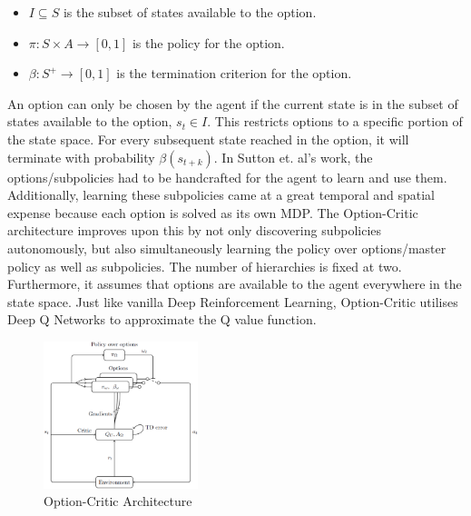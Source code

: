\documentclass[notitlepage,a4paper,11pt]{article}
\begin{document}
\begin{itemize}[noitemsep]
	\itemsep0em
	\item $I \subseteq S$ is the subset of states available to the option.
	\item $\pi : S \times A \to [0,1]$ is the policy for the option.
	\item $\beta : S^+ \to [0,1]$ is the termination criterion for the option.
\end{itemize}

An option can only be chosen by the agent if the current state is in the subset of states available to the option, $s_t \in I$. This restricts options to a specific portion of the state space. For every subsequent state reached in the option, it will terminate with probability $\beta(s_{t+k})$. In Sutton et. al's work, the options/subpolicies had to be handcrafted for the agent to learn and use them. Additionally, learning these subpolicies came at a great temporal and spatial expense because each option is solved as its own MDP. The Option-Critic architecture \cite{bacon2017option} improves upon this by not only discovering subpolicies autonomously, but also simultaneously learning the policy over options/master policy as well as subpolicies. The number of hierarchies is fixed at two. Furthermore, it assumes that options are available to the agent everywhere in the state space. Just like vanilla Deep Reinforcement Learning, Option-Critic utilises Deep Q Networks to approximate the Q value function.



\begin{figure}
	\vspace{-20pt}
	\begin{center}
		\includegraphics[width=0.4\textwidth]{figs/option_critic_architecture.eps}
	\end{center}
	\vspace{-20pt}
\caption{Option-Critic Architecture \protect\cite{ribas2011neural}} \label{fig:4}
\end{figure}
\end{document}
